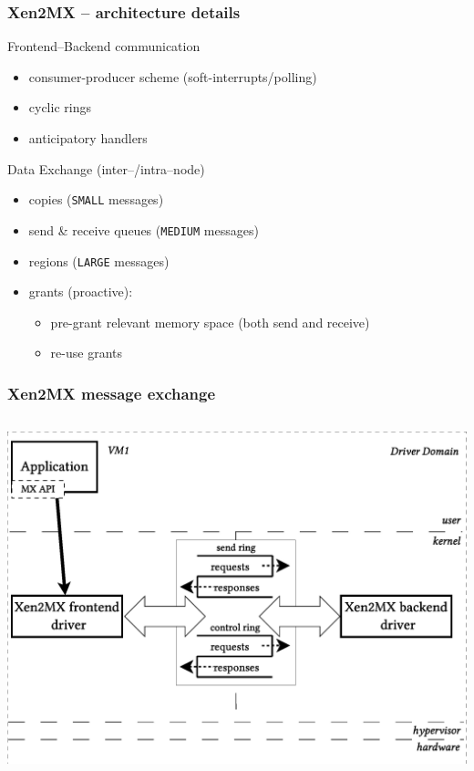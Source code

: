 \documentclass[red,slidestop,notes,compress,mathserif]{beamer}
\begin{document}
\begin{frame}
\frametitle{Xen2MX -- architecture details}
        \begin{block}{Frontend--Backend communication}
        \begin{itemize}
        \item consumer-producer scheme (soft-interrupts/polling)
        \item cyclic rings
        \item anticipatory handlers
        \end{itemize}
        \end{block}
        \begin{block}{Data Exchange (inter--/intra--node)}
        \begin{itemize}
        \item copies (\texttt{SMALL} messages)
        \item send \& receive queues (\texttt{MEDIUM} messages)
        \item regions (\texttt{LARGE} messages)
        \item grants (proactive):
                \begin{itemize}
                        \item pre-grant relevant memory space (both send and receive)
                        \item re-use grants
                \end{itemize}
        \end{itemize}
        \end{block}

\end{frame}


\begin{frame}
\frametitle{Xen2MX message exchange}
\begin{columns}
\includegraphics[width=\textwidth]{figs/bare/xen2mx_message_exchange.eps}
\end{columns}
\end{frame}
\end{document}
